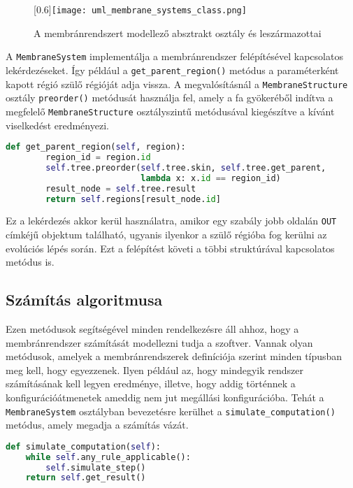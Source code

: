 \begin{figure}[H]
\centering
\advance\leftskip-3.5cm
	\scalebox{0.6}[0.6]{\texttt{[image: uml\_membrane\_systems\_class.png]}}
	\caption{A membránrendszert modellező absztrakt osztály és leszármazottai}
	\label{fig:system_uml}
\end{figure}

A \verb|MembraneSystem| implementálja a membránrendszer felépítésével kapcsolatos lekérdezéseket. Így például a \verb|get_parent_region()| metódus a paraméterként kapott régió szülő régióját adja vissza. 
A megvalósításnál a \verb|MembraneStructure| osztály \verb|preorder()| metódusát használja fel, amely a fa gyökeréből indítva a megfelelő \verb|MembraneStructure| osztályszintű metódusával kiegészítve a kívánt viselkedést eredményezi.

\begin{lstlisting}[language={Python}]
def get_parent_region(self, region):
        region_id = region.id
        self.tree.preorder(self.tree.skin, self.tree.get_parent,
                           lambda x: x.id == region_id)
        result_node = self.tree.result
        return self.regions[result_node.id]
\end{lstlisting}


Ez a lekérdezés akkor kerül használatra, amikor egy szabály jobb oldalán  \verb|OUT| címkéjű objektum található, ugyanis ilyenkor a szülő régióba fog kerülni az evolúciós lépés során. Ezt a felépítést követi a többi struktúrával kapcsolatos metódus is.

\subsection{Számítás algoritmusa}

Ezen metódusok segítségével minden rendelkezésre áll ahhoz, hogy a membránrendszer számítását modellezni tudja a szoftver. Vannak olyan metódusok, amelyek a membránrendszerek definíciója szerint minden típusban meg kell, hogy egyezzenek. Ilyen például az, hogy mindegyik rendszer számításának kell legyen eredménye, illetve, hogy addig történnek a konfigurációátmenetek ameddig nem jut megállási konfigurációba. Tehát a \verb|MembraneSystem| osztályban bevezetésre kerülhet a \verb|simulate_computation()| metódus, amely megadja a számítás vázát. 

\begin{lstlisting}[language={Python}]
def simulate_computation(self):
	while self.any_rule_applicable():
     	self.simulate_step()
	return self.get_result()
\end{lstlisting}

